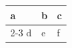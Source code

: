 \begin{tabular}{lll}
\toprule
a & b & c \\
\cmidrule(lr){2-3}
d & e & f \\
\bottomrule
\end{tabular}
